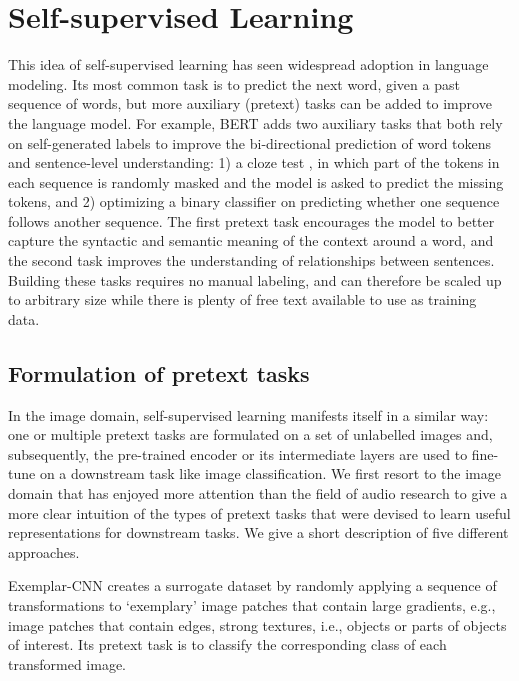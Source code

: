 \section{Self-supervised Learning}\label{sec:self_supervised_learning}
This idea of self-supervised learning has seen widespread adoption in language modeling.
Its most common task is to predict the next word, given a past sequence of words, but more auxiliary (pretext) tasks can be added to improve the language model.
For example, BERT \cite{Devlin2019BERTPO} adds two auxiliary tasks that both rely on self-generated labels to improve the bi-directional prediction of word tokens and sentence-level understanding: 1) a cloze test \cite{doi:10.1177/107769905303000401}, in which part of the tokens in each sequence is randomly masked and the model is asked to predict the missing tokens, and 2) optimizing a binary classifier on predicting whether one sequence follows another sequence.
The first pretext task encourages the model to better capture the syntactic and semantic meaning of the context around a word, and the second task improves the understanding of relationships between sentences.
Building these tasks requires no manual labeling, and can therefore be scaled up to arbitrary size while there is plenty of free text available to use as training data.\\

\subsection{Formulation of pretext tasks}
In the image domain, self-supervised learning manifests itself in a similar way: one or multiple pretext tasks are formulated on a set of unlabelled images and, subsequently, the pre-trained encoder or its intermediate layers are used to fine-tune on a downstream task like image classification.
We first resort to the image domain that has enjoyed more attention than the field of audio research to give a more clear intuition of the types of pretext tasks that were devised to learn useful representations for downstream tasks.
We give a short description of five different approaches.

Exemplar-CNN \cite{dosovitskiy_discriminative_2014} creates a surrogate dataset by randomly applying a sequence of transformations to `exemplary' image patches that contain large gradients, e.g., image patches that contain edges, strong textures, i.e., objects or parts of objects of interest.
Its pretext task is to classify the corresponding class of each transformed image.

